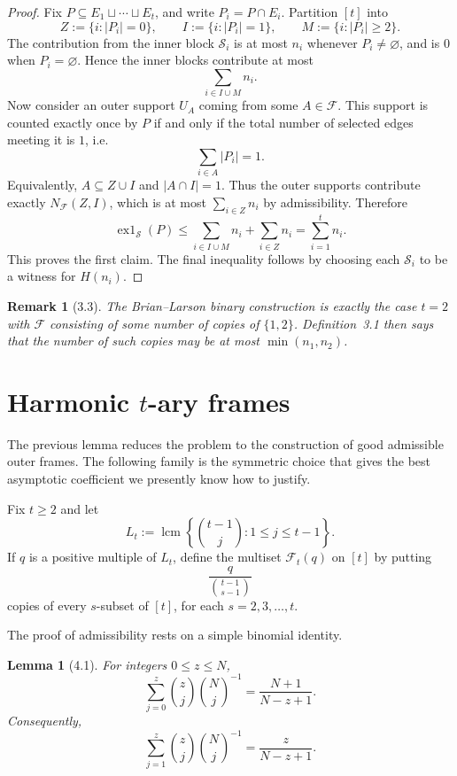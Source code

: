 \documentclass[11pt]{article}
\newtheorem{lemma}[theorem]{Lemma}
\newtheorem{remark}[theorem]{Remark}
\begin{document}
\begin{proof}
Fix $P \subseteq E_1 \sqcup \cdots \sqcup E_t$, and write $P_i = P \cap E_i$. Partition $[t]$ into
\[
Z := \{ i : |P_i| = 0\}, \qquad I := \{ i : |P_i| = 1\}, \qquad M := \{ i : |P_i| \ge 2\}.
\]
The contribution from the inner block $\mathcal S_i$ is at most $n_i$ whenever $P_i \neq \varnothing$, and is $0$ when $P_i = \varnothing$. Hence the inner blocks contribute at most
\[
\sum_{i \in I \cup M} n_i.
\]
Now consider an outer support $U_A$ coming from some $A \in \mathcal F$. This support is counted exactly once by $P$ if and only if the total number of selected edges meeting it is $1$, i.e.
\[
\sum_{i \in A} |P_i| = 1.
\]
Equivalently, $A \subseteq Z \cup I$ and $|A \cap I| = 1$. Thus the outer supports contribute exactly $N_{\mathcal F}(Z,I)$, which is at most $\sum_{i \in Z} n_i$ by admissibility. Therefore
\[
\operatorname{ex1}_{\mathcal S}(P) \le \sum_{i \in I \cup M} n_i + \sum_{i \in Z} n_i = \sum_{i=1}^t n_i.
\]
This proves the first claim. The final inequality follows by choosing each $\mathcal S_i$ to be a witness for $H(n_i)$.
\end{proof}

\begin{remark}[3.3]
The Brian--Larson binary construction is exactly the case $t=2$ with $\mathcal F$ consisting of some number of copies of $\{1,2\}$. Definition~3.1 then says that the number of such copies may be at most $\min(n_1,n_2)$.
\end{remark}

\section{Harmonic $t$-ary frames}

The previous lemma reduces the problem to the construction of good admissible outer frames. The following family is the symmetric choice that gives the best asymptotic coefficient we presently know how to justify.

Fix $t \ge 2$ and let
\[
L_t := \operatorname{lcm}\left\{ \binom{t-1}{j} : 1 \le j \le t-1 \right\}.
\]
If $q$ is a positive multiple of $L_t$, define the multiset $\mathcal F_t(q)$ on $[t]$ by putting
\[
\frac{q}{\binom{t-1}{s-1}}
\]
copies of every $s$-subset of $[t]$, for each $s=2,3,\dots,t$.

The proof of admissibility rests on a simple binomial identity.

\begin{lemma}[4.1]
For integers $0 \le z \le N$,
\[
\sum_{j=0}^z \binom{z}{j} \binom{N}{j}^{-1} = \frac{N+1}{N-z+1}.
\]
Consequently,
\[
\sum_{j=1}^z \binom{z}{j} \binom{N}{j}^{-1} = \frac{z}{N-z+1}.
\]
\end{lemma}
\end{document}
